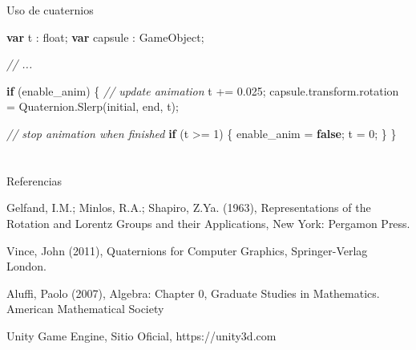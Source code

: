 \documentclass[,ignorenonframetext,compress]{beamer}
\newenvironment{Shaded}{}{}
\newcommand{\KeywordTok}[1]{\textcolor[rgb]{0.00,0.44,0.13}{\textbf{#1}}}
\newcommand{\DecValTok}[1]{\textcolor[rgb]{0.25,0.63,0.44}{#1}}
\newcommand{\FloatTok}[1]{\textcolor[rgb]{0.25,0.63,0.44}{#1}}
\newcommand{\CommentTok}[1]{\textcolor[rgb]{0.38,0.63,0.69}{\textit{#1}}}
\newcommand{\VariableTok}[1]{\textcolor[rgb]{0.10,0.09,0.49}{#1}}
\newcommand{\ControlFlowTok}[1]{\textcolor[rgb]{0.00,0.44,0.13}{\textbf{#1}}}
\newcommand{\OperatorTok}[1]{\textcolor[rgb]{0.40,0.40,0.40}{#1}}
\newcommand{\AttributeTok}[1]{\textcolor[rgb]{0.49,0.56,0.16}{#1}}
\newcommand{\NormalTok}[1]{#1}
\begin{document}
\begin{frame}[fragile]{Uso de cuaternios}

\tiny

\begin{Shaded}
\begin{Highlighting}[]
\KeywordTok{var}\NormalTok{ t }\OperatorTok{:}\NormalTok{ float}\OperatorTok{;}
\KeywordTok{var}\NormalTok{ capsule }\OperatorTok{:}\NormalTok{ GameObject}\OperatorTok{;}

\CommentTok{// ...}

\ControlFlowTok{if}\NormalTok{ (enable_anim) }\OperatorTok{\{}
  \CommentTok{// update animation}
\NormalTok{  t }\OperatorTok{+=} \FloatTok{0.025}\OperatorTok{;}
  \VariableTok{capsule}\NormalTok{.}\VariableTok{transform}\NormalTok{.}\AttributeTok{rotation} \OperatorTok{=} \VariableTok{Quaternion}\NormalTok{.}\AttributeTok{Slerp}\NormalTok{(initial}\OperatorTok{,}\NormalTok{ end}\OperatorTok{,}\NormalTok{ t)}\OperatorTok{;}

  \CommentTok{// stop animation when finished}
  \ControlFlowTok{if}\NormalTok{ (t }\OperatorTok{>=} \DecValTok{1}\NormalTok{) }\OperatorTok{\{}
\NormalTok{    enable_anim }\OperatorTok{=} \KeywordTok{false}\OperatorTok{;}
\NormalTok{    t }\OperatorTok{=} \DecValTok{0}\OperatorTok{;}
  \OperatorTok{\}}
\OperatorTok{\}}
\end{Highlighting}
\end{Shaded}

\normalsize

\end{frame}

\section{}\label{section}

\begin{frame}{Referencias}

\begin{thebibliography}{9}

  Gelfand, I.M.; Minlos, R.A.; Shapiro, Z.Ya. (1963),
  Representations of the Rotation and Lorentz Groups and their Applications,
  New York: Pergamon Press.

  Vince, John (2011),
  Quaternions for Computer Graphics,
  Springer-Verlag London.

  Aluffi, Paolo (2007),
  Algebra: Chapter 0,
  Graduate Studies in Mathematics. American Mathematical Society

  Unity Game Engine,
  Sitio Oficial,
  https://unity3d.com

\end{thebibliography}

\end{frame}
\end{document}
